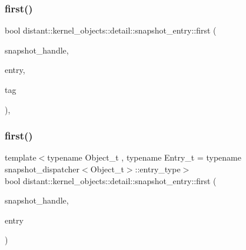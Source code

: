 \subsubsection{\texorpdfstring{first()}{first()}\hspace{0.1cm}{\footnotesize\ttfamily [1/2]}}
{\footnotesize\ttfamily bool distant\+::kernel\+\_\+objects\+::detail\+::snapshot\+\_\+entry\+::first (\begin{DoxyParamCaption}\item[{const boost\+::winapi\+::\+H\+A\+N\+D\+L\+E\+\_\+}]{snapshot\+\_\+handle,  }\item[{\mbox{\hyperlink{namespaceboost_1_1winapi_aa148b1a2cd4a16c95b05b56d8b31cc4c}{boost\+::winapi\+::\+P\+R\+O\+C\+E\+S\+S\+E\+N\+T\+R\+Y32\+\_\+}} $\ast$}]{entry,  }\item[{\mbox{\hyperlink{classdistant_1_1detail_1_1process__tag}{distant\+::detail\+::process\+\_\+tag}}}]{tag }\end{DoxyParamCaption})\hspace{0.3cm}{\ttfamily [inline]}, {\ttfamily [noexcept]}}

\mbox{\label{namespacedistant_1_1kernel__objects_1_1detail_1_1snapshot__entry_ab69397112f991eeda47c1c4e5843c1c0}} 
\subsubsection{\texorpdfstring{first()}{first()}\hspace{0.1cm}{\footnotesize\ttfamily [2/2]}}
{\footnotesize\ttfamily template$<$typename Object\+\_\+t , typename Entry\+\_\+t  = typename snapshot\+\_\+dispatcher$<$\+Object\+\_\+t$>$\+::entry\+\_\+type$>$ \\
bool distant\+::kernel\+\_\+objects\+::detail\+::snapshot\+\_\+entry\+::first (\begin{DoxyParamCaption}\item[{boost\+::winapi\+::\+H\+A\+N\+D\+L\+E\+\_\+}]{snapshot\+\_\+handle,  }\item[{Entry\+\_\+t \&}]{entry }\end{DoxyParamCaption})\hspace{0.3cm}{\ttfamily [noexcept]}}


